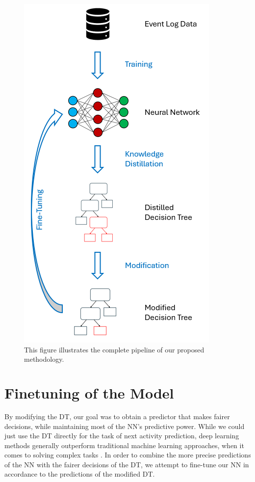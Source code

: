 \begin{figure}[h]
    \centering
    \includegraphics[width=\textwidth,height=0.6\textheight,keepaspectratio]{gfx/methodology.png}
    \caption{This figure illustrates the complete pipeline of our proposed methodology.}
    \label{fig:methodology}
\end{figure}

\section{Finetuning of the Model}
By modifying the DT, our goal was to obtain a predictor that 
makes fairer decisions, while maintaining most of the NN's predictive power.
While we could just use the DT directly for the task of next activity prediction,
deep learning methods generally outperform traditional machine learning approaches,
when it comes to solving complex tasks \cite{ml_comparison}.
In order to combine the more precise predictions of the NN with the fairer decisions of the DT,
we attempt to fine-tune our NN in accordance to the predictions of the modified DT.

